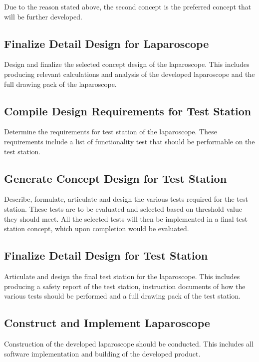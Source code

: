 Due to the reason stated above, the second concept is the preferred concept that will be further developed.

\subsection{Finalize Detail Design for Laparoscope}

Design and finalize the selected concept design of the laparoscope. This includes producing relevant calculations and analysis of the developed laparoscope and the full drawing pack of the laparoscope.

\subsection{Compile Design Requirements for Test Station}

Determine the requirements for test station of the laparoscope. These requirements include a list of functionality test that should be performable on the test station. 

\subsection{Generate Concept Design for Test Station}

Describe, formulate, articulate and design the various tests required for the test station. These tests are to be evaluated and selected based on threshold value they should meet. All the selected tests will then be implemented in a final test station concept, which upon completion would be evaluated. 

\subsection{Finalize Detail Design for Test Station}

Articulate and design the final test station for the laparoscope. This includes producing a safety report of the test station, instruction documents of how the various tests should be performed and a full drawing pack of the test station.

\subsection{Construct and Implement Laparoscope}

Construction of the developed laparoscope should be conducted. This includes all software implementation and building of the developed product.

